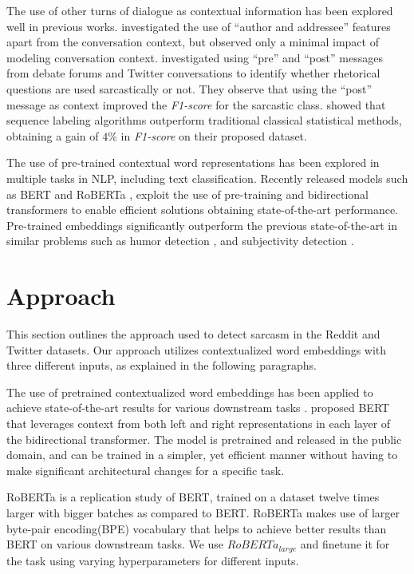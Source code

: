 \documentclass[11pt,a4paper]{article}
\begin{document}
The use of other turns of dialogue as contextual information has been explored well in previous works. \citet{Bamman-Smith-2015} investigated the use of “author and addressee” features apart from the conversation context, but observed only a minimal impact of modeling conversation context. \citet{oraby-et-al-2017} investigated using “pre” and “post” messages from debate forums and Twitter conversations to identify whether rhetorical questions are used sarcastically or not. They observe that using the “post” message as context improved the \textit{F1-score} for the sarcastic class. \citet{joshi-etal-2016-harnessing} showed that sequence labeling algorithms outperform traditional classical statistical methods, obtaining a gain of $4\%$ in \textit{F1-score} on their proposed dataset.

The use of pre-trained contextual word representations has been explored in multiple tasks in NLP, including text classification. Recently released models such as BERT \cite{Devlin2019} and RoBERTa \cite{2020roberta}, exploit the use of pre-training and bidirectional transformers to enable efficient solutions obtaining state-of-the-art performance. Pre-trained embeddings significantly outperform the previous state-of-the-art in similar problems such as humor detection \citep{Weller2019HumorDA}, and subjectivity detection \citep{subjective-detection}.

\section{Approach}
This section outlines the approach used to detect sarcasm in the Reddit and Twitter datasets. Our approach utilizes contextualized word embeddings with three different inputs, as explained in the following paragraphs. 

The use of pretrained contextualized word embeddings has been applied to achieve state-of-the-art results for various downstream tasks \cite{Devlin2019,2020roberta}. \citet{Devlin2019} proposed BERT that leverages context from both left and right representations in each layer of the bidirectional transformer. The model is pretrained and released in the public domain, and can be trained in a simpler, yet efficient manner without having to make significant architectural changes for a specific task.  

RoBERTa \citep{2020roberta} is a replication study of BERT, trained on a dataset twelve times larger with bigger batches as compared to BERT. RoBERTa makes use of larger byte-pair encoding(BPE) vocabulary that helps to achieve better results than BERT on various downstream tasks. We use $RoBERTa_{large}$ and finetune it for the task using varying hyperparameters for different inputs.
\end{document}
